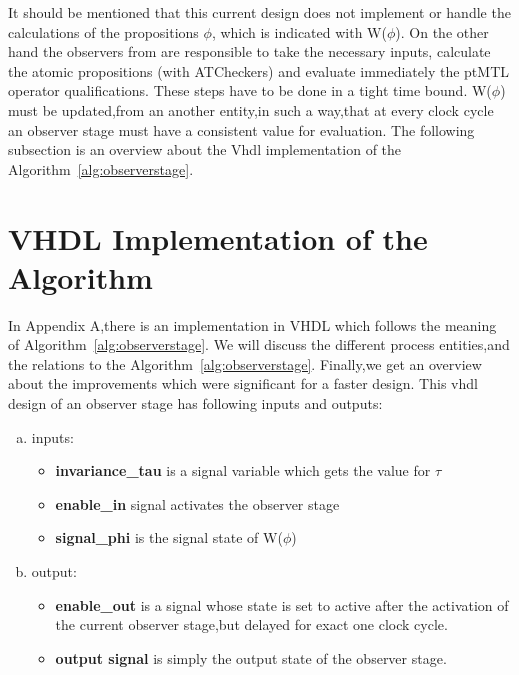It should be mentioned that this current design does not implement or handle the calculations of the propositions $\phi$, 
which is indicated with W($\phi$). On the other hand the observers from \cite{RTFMBJ13} are responsible to take the necessary inputs,
calculate the atomic propositions (with ATCheckers) and evaluate immediately the ptMTL operator qualifications.  
These steps have to be done in a tight time bound.
W($\phi$) must be updated,from an another entity,in such a way,that at every clock cycle an observer stage must have a consistent value for evaluation.
The following subsection is an overview about the Vhdl implementation of the Algorithm~\ref{alg:observerstage}.
\section{VHDL Implementation of the Algorithm}  

In Appendix A,there is an implementation in VHDL which follows the meaning of Algorithm~\ref{alg:observerstage}.
We will discuss the different process entities,and the relations to the Algorithm~\ref{alg:observerstage}.
Finally,we get an overview about the improvements which were significant for a faster design. 
This vhdl design of an observer stage has following inputs and outputs:
\begin{enumerate}[(a)]
\item inputs:
\begin{itemize}
\item \textbf{invariance\_tau} is a signal variable which gets the value for $\tau$
\item \textbf{enable\_in} signal activates the observer stage
\item \textbf{signal\_phi} is the signal state of W($\phi$)
\end{itemize}
\item output:
\begin{itemize}
\item \textbf{enable\_out} is a signal whose state is set to active after the activation of the current observer stage,but delayed for exact one clock cycle.   
\item \textbf{output signal} is simply the output state of the observer stage.
\end{itemize}
\end{enumerate}

